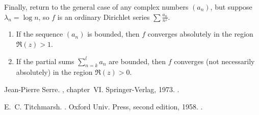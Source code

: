 \documentclass[12pt]{article}
\begin{document}
Finally, return to the general case of any complex numbers $(a_n)$, but
suppose $\lambda_n=\log n$, so $f$ is an ordinary Dirichlet series
$\sum\frac{a_n}{n^z}$.
\begin{enumerate}
\item
If the sequence $(a_n)$ is bounded, then $f$ converges absolutely in the
region $\Re(z)>1$.
\item
If the partial sums $\sum_{n=k}^l a_n$ are bounded, then $f$ converges
(not necessarily absolutely) in the region $\Re(z)>0$.
\end{enumerate}

\begin{thebibliography}{1}

{Jean-Pierre} Serre.
, chapter~VI.
\newblock Springer-Verlag, 1973.
\newblock {}.

E.~C. Titchmarsh.
.
\newblock Oxford Univ. Press, second edition, 1958.
\newblock {}.

\end{thebibliography}
\end{document}
